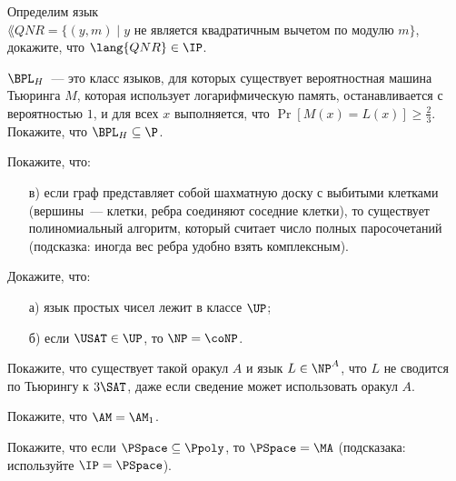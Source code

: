 \begin{ptask}{45}
    Определим язык $\lang{QNR} = \{(y, m) \mid \text{$y$ не является квадратичным вычетом по модулю $m$}\}$, докажите, что
    $\lang{QNR} \in \IP$.
\end{ptask}

\begin{ptask}{46}
    $\BPL_H$~--- это класс языков, для которых существует вероятностная машина Тьюринга $M$, которая использует логарифмическую
    память, останавливается с вероятностью $1$, и для всех $x$ выполняется, что $\Pr[M(x) = L(x)] \ge \frac{2}{3}$. Покажите, что
    $\BPL_H \subseteq \P$.
\end{ptask}

\begin{ptask}{49}
    Покажите, что:
    \begin{enumerate}[topsep = 0pt, itemsep = -1ex]
        \item [в)] если граф представляет собой шахматную доску с выбитыми клетками
            (вершины~--- клетки, ребра соединяют соседние клетки), то существует
            полиномиальный алгоритм, который считает число полных паросочетаний
            (подсказка: иногда вес ребра удобно взять комплексным).
    \end{enumerate}
\end{ptask}


\begin{ptask}{54}
    Докажите, что: 
    \begin{enumerate}[topsep = 0pt, itemsep = -1ex]
        \item [а)] язык простых чисел лежит в классе $\UP$;
        \item [б)] если $\USAT \in \UP$, то $\NP = \coNP$.
    \end{enumerate}
\end{ptask}

\begin{ptask}{55}
    Покажите, что существует такой оракул $A$ и язык $L \in \NP^A$, что $L$ не
    сводится по Тьюрингу к $3\SAT$, даже если сведение может использовать оракул $A$.
\end{ptask}

\begin{ptask}{57}
    Покажите, что $\AM = \AM_1$.
\end{ptask}

\begin{ptask}{59}
    Покажите, что если $\PSpace \subseteq \Ppoly$, то $\PSpace = \MA$ (подсказака: используйте $\IP = \PSpace$).
\end{ptask}